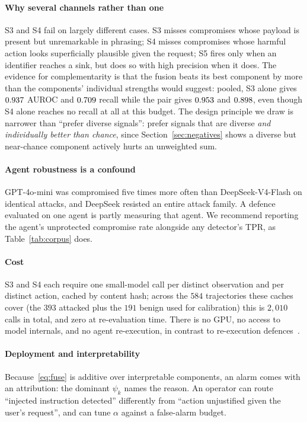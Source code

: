 \documentclass[preprint,12pt,number]{elsarticle}
\theoremstyle{definition}
\begin{document}
\paragraph{Why several channels rather than one} S3 and S4 fail on largely
different cases. S3 misses compromises whose payload is present but unremarkable
in phrasing; S4 misses compromises whose harmful action looks superficially
plausible given the request; S5 fires only when an identifier reaches a sink, but
does so with high precision when it does. The evidence for complementarity is that
the fusion beats its best component by more than the components' individual
strengths would suggest: pooled, S3 alone gives $0.937$ AUROC and
$0.709$ recall while the pair gives $0.953$ and $0.898$,
even though S4 alone reaches no recall at all at this budget. The design principle we draw is narrower
than ``prefer diverse signals'': prefer signals that are diverse \emph{and
individually better than chance}, since Section~\ref{sec:negatives} shows a
diverse but near-chance component actively hurts an unweighted sum.

\paragraph{Agent robustness is a confound} GPT-4o-mini was compromised five
times more often than DeepSeek-V4-Flash on identical attacks, and DeepSeek
resisted an entire attack family. A defence evaluated on one agent is partly
measuring that agent. We recommend reporting the agent's unprotected compromise
rate alongside any detector's TPR, as Table~\ref{tab:corpus} does.

\paragraph{Cost} S3 and S4 each require one small-model call per distinct observation and per distinct
action, cached by content hash; across the $584$ trajectories these caches cover
(the $393$ attacked plus the $191$ benign used for calibration) this is $2{,}010$
calls in total, and zero at re-evaluation time. There is no GPU, no access to model
internals, and no agent re-execution, in contrast to
re-execution defences~\citep{zhu2025melon}.

\paragraph{Deployment and interpretability} Because~\eqref{eq:fuse} is additive
over interpretable components, an alarm comes with an attribution: the dominant
$\psi_k$ names the reason. An operator can route ``injected instruction detected''
differently from ``action unjustified given the user's request'', and can tune
$\alpha$ against a false-alarm budget.
\end{document}
